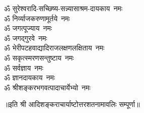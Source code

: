 \begin{multicols}{2}
\begin{flushleft}
        ॐ सुरेश्वरादि-सच्छिष्य-सन्न्यासाश्रम-दायकाय~नमः\\
        ॐ निर्व्याजकरुणामूर्तये~नमः\\
        ॐ जगत्पूज्याय~नमः\\
        ॐ जगद्गुरवे~नमः\\
        ॐ भेरी\-पटह\-वाद्यादि\-राजलक्षण\-लक्षिताय~नमः\\
        ॐ सकृत्स्मरणसन्तुष्टाय~नमः\\
        ॐ सर्वज्ञाय~नमः\\
        ॐ ज्ञानदायकाय~नमः\hfill{}\\
        ॐ श्रीशङ्करभगवत्\-पादाचार्येभ्यो~नमः\\
                                                                                
    \end{flushleft}
\end{multicols}
॥इति श्री आदिशङ्कराचार्याष्टोत्तरशतनामावलिः  सम्पूर्णा॥
